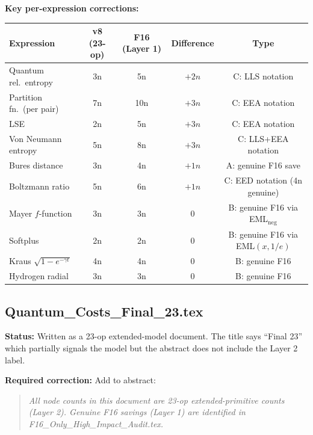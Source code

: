 \documentclass[11pt]{article}
\begin{document}
\textbf{Key per-expression corrections:}
\begin{center}
\renewcommand{\arraystretch}{1.2}
\begin{tabular}{lcccc}
\toprule
Expression & v8 (23-op) & F16 (Layer 1) & Difference & Type \\
\midrule
Quantum rel.\ entropy & 3n & 5n & $+2n$ & C: LLS notation \\
Partition fn.\ (per pair) & 7n & 10n & $+3n$ & C: EEA notation \\
LSE & 2n & 5n & $+3n$ & C: EEA notation \\
Von Neumann entropy & 5n & 8n & $+3n$ & C: LLS+EEA notation \\
Bures distance & 3n & 4n & $+1n$ & A: genuine F16 save \\
Boltzmann ratio & 5n & 6n & $+1n$ & C: EED notation (4n genuine) \\
Mayer $f$-function & 3n & 3n & $0$ & B: genuine F16 via EML$_\mathrm{neg}$ \\
Softplus & 2n & 2n & $0$ & B: genuine F16 via EML$(x,1/e)$ \\
Kraus $\sqrt{1-e^{-\gamma t}}$ & 4n & 4n & $0$ & B: genuine F16 \\
Hydrogen radial & 3n & 3n & $0$ & B: genuine F16 \\
\bottomrule
\end{tabular}
\end{center}

\subsection{Quantum\_Costs\_Final\_23.tex}

\textbf{Status:} Written as a 23-op extended-model document.
The title says ``Final 23'' which partially signals the model but the
abstract does not include the Layer 2 label.

\textbf{Required correction:} Add to abstract:
\begin{quote}
\textit{All node counts in this document are 23-op extended-primitive counts (Layer 2).
Genuine F16 savings (Layer 1) are identified in F16\_Only\_High\_Impact\_Audit.tex.}
\end{quote}
\end{document}
